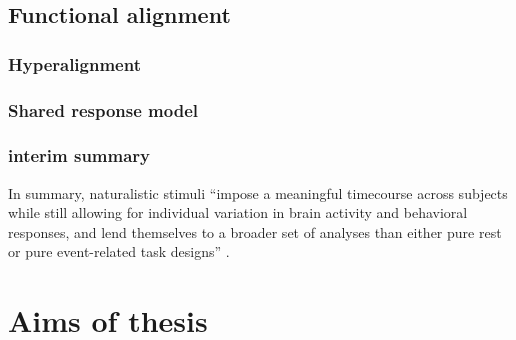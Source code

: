 

\subsection{Functional alignment}


\subsubsection{Hyperalignment}


\subsubsection{Shared response model}


\subsubsection{interim summary}
In summary, naturalistic stimuli ``impose a meaningful timecourse across
subjects while still allowing for individual variation in brain activity and
behavioral responses, and lend themselves to a broader set of analyses than
either pure rest or pure event-related task designs'' \citep{finn2017can}.



\section{Aims of thesis}

